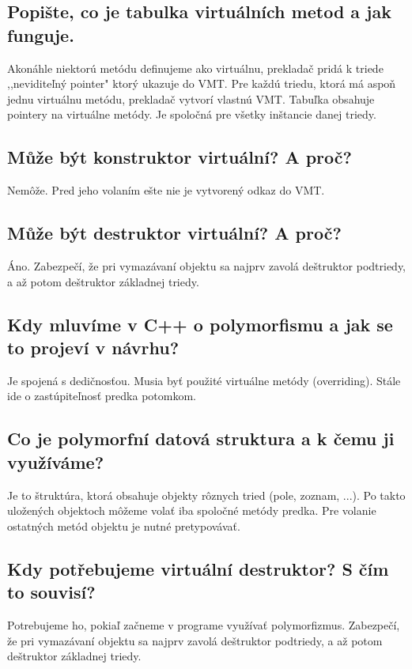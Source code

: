 \subsection{Popište, co je tabulka virtuálních metod a jak funguje.}
Akonáhle niektorú metódu definujeme ako virtuálnu, prekladač pridá k triede ,,neviditeľný pointer" ktorý ukazuje do VMT. Pre každú triedu, ktorá má aspoň jednu virtuálnu metódu, prekladač vytvorí vlastnú VMT. Tabuľka obsahuje pointery na virtuálne metódy. Je spoločná pre všetky inštancie danej triedy.

\subsection{Může být konstruktor virtuální? A proč?}
Nemôže. Pred jeho volaním ešte nie je vytvorený odkaz do VMT.

\subsection{Může být destruktor virtuální? A proč?}
Áno. Zabezpečí, že pri vymazávaní objektu sa najprv zavolá deštruktor podtriedy, a až potom deštruktor základnej triedy.

\subsection{Kdy mluvíme v C++ o polymorfismu a jak se to projeví v návrhu?}
Je spojená s dedičnosťou. Musia byť použité virtuálne metódy (overriding). Stále ide o zastúpiteľnosť predka potomkom.

\subsection{Co je polymorfní datová struktura a k čemu ji využíváme?}
Je to štruktúra, ktorá obsahuje objekty rôznych tried (pole, zoznam, ...). Po takto uložených objektoch môžeme volať iba spoločné metódy predka. Pre volanie ostatných metód objektu je nutné pretypovávať.  

\subsection{Kdy potřebujeme virtuální destruktor? S čím to souvisí?}
Potrebujeme ho, pokiaľ začneme v programe využívať polymorfizmus. Zabezpečí, že pri vymazávaní objektu sa najprv zavolá deštruktor podtriedy, a až potom deštruktor základnej triedy.